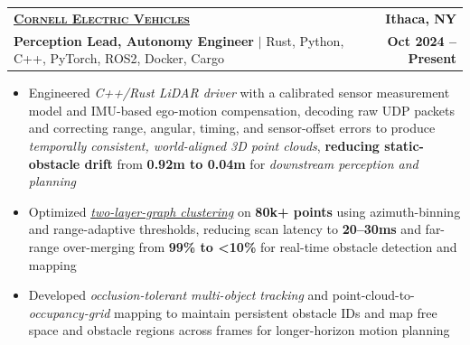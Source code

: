 \documentclass[letterpaper,11pt]{article}
\makeatletter
\newcommand{\link}[2]{\href{#1}{\uline{#2}}}
\newcommand{\entry}[4]{%
  \item
  \begin{tabular*}{\textwidth}[t]{l@{\extracolsep{\fill}}r}
    #1 & #2 \\
    #3 & #4 \\
  \end{tabular*}\vspace{-6pt}}
\newcommand{\bullets}{\begin{itemize}[leftmargin=0.18in, itemsep=0pt, parsep=0pt, topsep=3pt, partopsep=0pt, label=\textbullet]}
\newcommand{\bulletsend}{\end{itemize}\vspace{-3pt}}
\makeatother
\begin{document}
  \entry{\large \scshape \link{https://www.cornellelectricvehicles.org/}{\textbf{Cornell Electric Vehicles}}}{\textbf{Ithaca, NY}}
        {\textbf{Perception Lead, Autonomy Engineer}  $|$ Rust, Python, C++, PyTorch, ROS2, Docker, Cargo}{\textbf{Oct 2024 -- Present}}
  \bullets
    \item Engineered \textit{C++/Rust LiDAR driver} with a calibrated sensor measurement model and IMU-based ego-motion compensation, decoding
      raw UDP packets and correcting range, angular, timing, and sensor-offset errors to
      produce \textit{temporally consistent, world-aligned 3D point clouds}, \textbf{reducing static-obstacle drift} from \textbf{0.92m to 0.04m} for \textit{downstream perception and planning}
    \item Optimized \link{https://www.mdpi.com/2076-3417/10/23/8534}{\textit{two-layer-graph clustering}}
      on \textbf{80k+ points} using azimuth-binning and range-adaptive thresholds, reducing scan latency to
      \textbf{20--30ms} and far-range over-merging from \textbf{99\% to <10\%} for real-time obstacle detection and mapping
    \item Developed \textit{occlusion-tolerant multi-object tracking} and point-cloud-to-\textit{occupancy-grid} mapping to maintain persistent obstacle IDs 
      and map free space and obstacle regions across frames for longer-horizon motion planning
  \bulletsend
\end{document}
